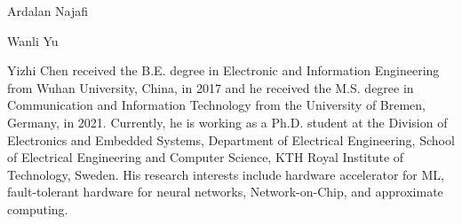 \begin{IEEEbiography}{Ardalan Najafi}
\end{IEEEbiography}

\begin{IEEEbiography}{Wanli Yu}
\end{IEEEbiography}

\begin{IEEEbiography}{Yizhi Chen} received the B.E. degree in Electronic and Information Engineering from Wuhan University, China, in 2017 and he received the M.S. degree in Communication and Information Technology from the University of Bremen, Germany, in 2021. Currently, he is working as a Ph.D. student at the Division of Electronics and Embedded Systems, Department of Electrical Engineering, School of Electrical Engineering and Computer Science, KTH Royal Institute of Technology, Sweden. His research interests include hardware accelerator for ML, fault-tolerant hardware for neural networks, Network-on-Chip, and approximate computing.
\end{IEEEbiography}

